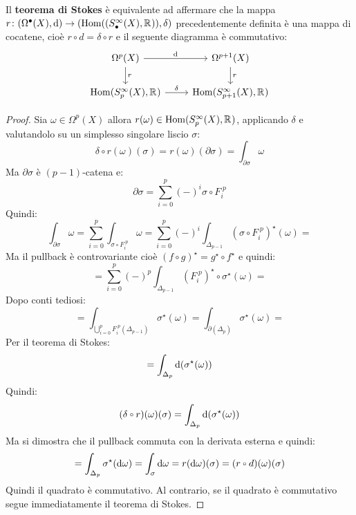 \begin{theorem}
  Il \textbf{teorema di Stokes} è equivalente ad affermare che la mappa
  $ r \colon (\Omega^\bullet(X), \operatorname{d}\!{}) \to (\mathrm{Hom}( (S^\infty_\bullet(X), \mathbb{R}^{})), \delta) $ precedentemente definita
  è una mappa di cocatene, cioè $ r \circ d = \delta \circ r $ e il seguente diagramma è
  commutativo:
  \[
    \begin{tikzcd}
      \Omega^p(X) \rar{\d{}} \dar{r} & \Omega^{p+1}(X) \dar{r} \\
      \hom{S^\infty_p(X), \RN{}} \rar{\delta} & \hom{S^\infty_{p+1}(X), \RN{}}
    \end{tikzcd}
  \]
\end{theorem}
\begin{proof}
  Sia $ \omega \in \Omega^p(X) $ allora $ r(\omega) \in \mathrm{Hom}( S^\infty_p(X), \mathbb{R}^{}) $, applicando $ \delta $
  e valutandolo su un simplesso singolare liscio $ \sigma $:
  \[
    \delta \circ r(\omega)(\sigma) = r(\omega)(\partial \sigma) = \int_{\partial \sigma} \omega
  \]
  Ma $ \partial \sigma $ è $ (p-1) $-catena e:
  \[
    \partial \sigma = \sum_{i=0}^p(-)^i\sigma \circ F_i^{\; p}
  \]
  Quindi:
  \[
    \int_{\partial \sigma} \omega = \sum_{i=0}^p \int_{\sigma \circ F_i^{\; p}} \omega = \sum_{i=0}^p(-)^i \int_{\Delta_{p-1}} (\sigma \circ F_i^{\; p})^\star (\omega) =
  \]
  Ma il pullback è controvariante cioè $ (f \circ g)^\star = g^\star \circ f^\star $ e quindi:
  \[
    =\sum_{i=0}^p (-)^p \int_{\Delta_{p-1}} (F_i^{\; p})^\star \circ \sigma^\star (\omega) =
  \]
  Dopo conti tediosi:
  \[
    = \int_{\bigcup_{i=0}^p F_i^{\; p}(\Delta_{p-1})} \sigma^\star(\omega) = \int_{\partial(\Delta_p)} \sigma^\star(\omega) =
  \]
  Per il teorema di Stokes:
  \[
    = \int_{\Delta_p} \operatorname{d}\!{(\sigma^\star(\omega))}
  \]
  Quindi:
  \[
    (\delta \circ r)(\omega)(\sigma) = \int_{\Delta_p} \d{(\sigma^\star(\omega))}
  \]
  Ma si dimostra che il pullback commuta con la derivata esterna e quindi:
  \[
    = \int_{\Delta_p} \sigma^\star(\d \omega) = \int_\sigma \d \omega = r (\d \omega) (\sigma) = (r \circ d)(\omega)(\sigma)
  \]
  Quindi il quadrato è commutativo. Al contrario, se il quadrato è commutativo
  segue immediatamente il teorema di Stokes.
\end{proof}
